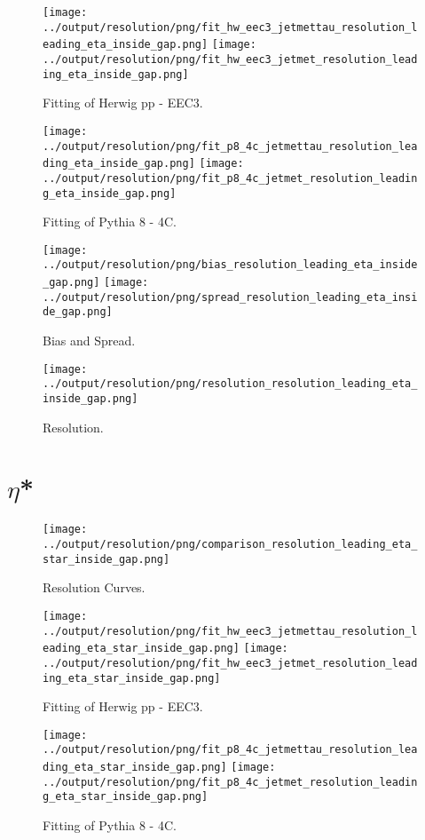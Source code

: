 \documentclass[11pt]{book}
\begin{document}
\begin{figure}[ht]
\centering
\texttt{[image: ../output/resolution/png/fit\_hw\_eec3\_jetmettau\_resolution\_leading\_eta\_inside\_gap.png]}
\texttt{[image: ../output/resolution/png/fit\_hw\_eec3\_jetmet\_resolution\_leading\_eta\_inside\_gap.png]}
\caption{Fitting of Herwig pp - EEC3.}
\end{figure}

\begin{figure}[ht]
\centering
\texttt{[image: ../output/resolution/png/fit\_p8\_4c\_jetmettau\_resolution\_leading\_eta\_inside\_gap.png]}
\texttt{[image: ../output/resolution/png/fit\_p8\_4c\_jetmet\_resolution\_leading\_eta\_inside\_gap.png]}
\caption{Fitting of Pythia 8 - 4C.}
\end{figure}

\begin{figure}[ht]
\centering
\texttt{[image: ../output/resolution/png/bias\_resolution\_leading\_eta\_inside\_gap.png]}
\texttt{[image: ../output/resolution/png/spread\_resolution\_leading\_eta\_inside\_gap.png]}
\caption{Bias and Spread.}
\end{figure}


\begin{figure}[ht]
\centering
\texttt{[image: ../output/resolution/png/resolution\_resolution\_leading\_eta\_inside\_gap.png]}
\caption{Resolution.}
\end{figure}
\clearpage


\section{$\eta$*}

\begin{figure}[ht]
\centering
\texttt{[image: ../output/resolution/png/comparison\_resolution\_leading\_eta\_star\_inside\_gap.png]}
\caption{Resolution Curves.}
\end{figure}


\begin{figure}[ht]
\centering
\texttt{[image: ../output/resolution/png/fit\_hw\_eec3\_jetmettau\_resolution\_leading\_eta\_star\_inside\_gap.png]}
\texttt{[image: ../output/resolution/png/fit\_hw\_eec3\_jetmet\_resolution\_leading\_eta\_star\_inside\_gap.png]}
\caption{Fitting of Herwig pp - EEC3.}
\end{figure}

\begin{figure}[ht]
\centering
\texttt{[image: ../output/resolution/png/fit\_p8\_4c\_jetmettau\_resolution\_leading\_eta\_star\_inside\_gap.png]}
\texttt{[image: ../output/resolution/png/fit\_p8\_4c\_jetmet\_resolution\_leading\_eta\_star\_inside\_gap.png]}
\caption{Fitting of Pythia 8 - 4C.}
\end{figure}
\end{document}
